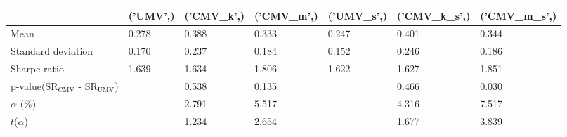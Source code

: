 \begin{tabular}{lllllll}
\toprule
 & ('UMV',) & ('CMV_k',) & ('CMV_m',) & ('UMV_s',) & ('CMV_k_s',) & ('CMV_m_s',) \\
\midrule
Mean & 0.278 & 0.388 & 0.333 & 0.247 & 0.401 & 0.344 \\
Standard deviation & 0.170 & 0.237 & 0.184 & 0.152 & 0.246 & 0.186 \\
Sharpe ratio & 1.639 & 1.634 & 1.806 & 1.622 & 1.627 & 1.851 \\
p-value(SR$_{\text{CMV}}$ - SR$_{\text{UMV}}$) &  & 0.538 & 0.135 &  & 0.466 & 0.030 \\
$\alpha$ (\%) &  & 2.791 & 5.517 &  & 4.316 & 7.517 \\
$t$($\alpha$) &  & 1.234 & 2.654 &  & 1.677 & 3.839 \\
\bottomrule
\end{tabular}
